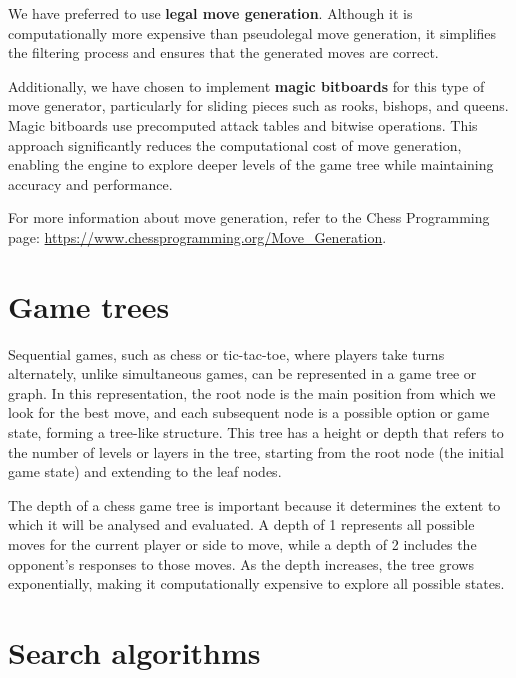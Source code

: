\noindent We have preferred to use \textbf{legal move generation}. Although it is computationally more expensive than pseudolegal move generation, it simplifies the filtering process and ensures that the generated moves are correct.

\vspace{1em}

\noindent Additionally, we have chosen to implement \textbf{magic bitboards} for this type of move generator, particularly for sliding pieces such as rooks, bishops, and queens. Magic bitboards use precomputed attack tables and bitwise operations. This approach significantly reduces the computational cost of move generation, enabling the engine to explore deeper levels of the game tree while maintaining accuracy and performance.

\vspace{1em}

\noindent For more information about move generation, refer to the Chess Programming page: \url{https://www.chessprogramming.org/Move_Generation}.

\section{Game trees}

Sequential games, such as chess or tic-tac-toe, where players take turns alternately, unlike simultaneous games, can be represented in a game tree or graph. In this representation, the root node is the main position from which we look for the best move, and each subsequent node is a possible option or game state, forming a tree-like structure. This tree has a height or depth that refers to the number of levels or layers in the tree, starting from the root node (the initial game state) and extending to the leaf nodes.

\vspace{1em}

\noindent The depth of a chess game tree is important because it determines the extent to which it will be analysed and evaluated. A depth of 1 represents all possible moves for the current player or side to move, while a depth of 2 includes the opponent's responses to those moves. As the depth increases, the tree grows exponentially, making it computationally expensive to explore all possible states.

\section{Search algorithms}

